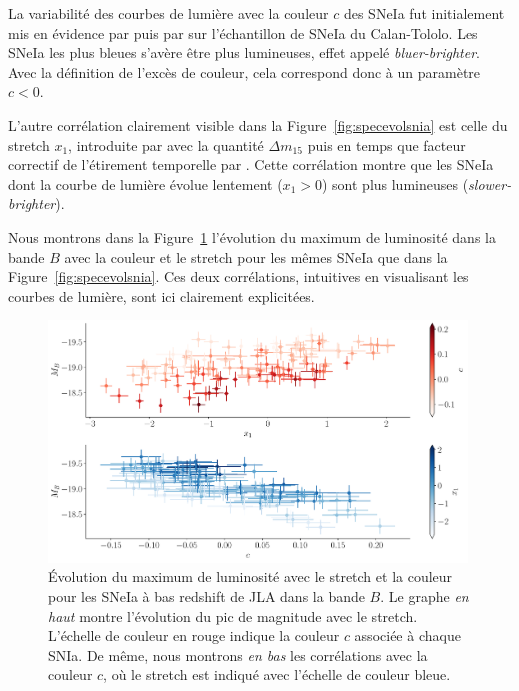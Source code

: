 \documentclass[../main/main.tex]{subfiles}
\begin{document}
La variabilité des courbes de lumière avec la couleur $c$ des SNeIa fut
initialement mis en évidence par \citet{Hamuy1996} puis par \citet{Tripp1999} sur l'échantillon de
SNeIa du Calan-Tololo. Les SNeIa les plus bleues s'avère être plus
lumineuses, effet appelé \textit{bluer-brighter}. Avec la définition de
l'excès de couleur, cela correspond donc à un paramètre $c<0$.

L'autre corrélation clairement visible dans la
Figure~\ref{fig:specevolsnia} est celle du
stretch $x_{1}$, introduite par \citet{Phillips1993} avec la quantité
$\Delta m_{15}$ puis en temps que facteur correctif de l'étirement
temporelle par \citet{Perlmutter1997}. Cette corrélation montre que les
SNeIa dont la courbe de lumière évolue lentement ($x_{1}>0$) sont plus
lumineuses (\textit{slower-brighter}).

Nous montrons dans la Figure~\ref{fig:colorstretch_corr_JLA} l'évolution
du maximum de luminosité dans la bande $B$ avec la couleur et le stretch
pour les mêmes SNeIa que dans la Figure~\ref{fig:specevolsnia}. Ces deux
corrélations, intuitives en visualisant les courbes de lumière, sont ici
clairement explicitées. 

\begin{figure}[ht]
  \centering
  \includegraphics[width=0.99\textwidth]{../figures/01bis_sne/colorstretch_corr_JLA.pdf}
  \caption[\'Evolution du maximum de luminosité avec le stretch et la
  couleur pour les SNeIa à bas redshift de JLA.]{\'Evolution du maximum de luminosité avec le stretch et la
  couleur pour les SNeIa à bas redshift de JLA dans la bande
  $B$. Le graphe \emph{en haut} montre l'évolution du pic de magnitude
  avec le stretch. L'échelle de
    couleur en rouge indique la couleur $c$ associée à chaque SNIa. De
    même, nous montrons \emph{en
      bas} les corrélations avec la couleur $c$, où le stretch est
    indiqué avec l'échelle de couleur bleue.}
  \label{fig:colorstretch_corr_JLA}
\end{figure}
\end{document}
